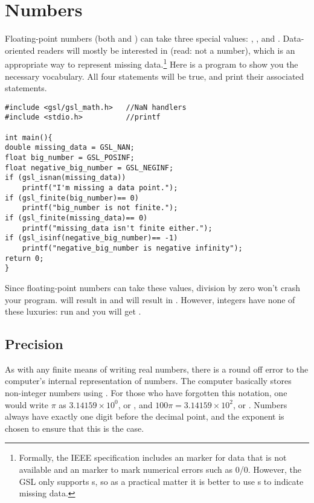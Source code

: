 \section{\treesymbol Numbers}       \label{numbers}
Floating-point numbers (both  and ) can take three special values: , , and . Data-oriented readers will mostly be
interested in  (read: not a number), which is an appropriate way to represent missing data.\footnote{Formally, the IEEE specification includes an  marker for data that is not available and an  marker to mark numerical errors such as 0/0. However, the GSL only supports s, so as a practical matter it is better to use s to indicate missing data.} Here is a
program to show you the necessary vocabulary. All four  statements will be true, and print their associated
statements.
\begin{lstlisting}
#include <gsl/gsl_math.h>   //NaN handlers
#include <stdio.h>          //printf

int main(){
double missing_data = GSL_NAN;
float big_number = GSL_POSINF;
float negative_big_number = GSL_NEGINF;
if (gsl_isnan(missing_data))
    printf("I'm missing a data point.");
if (gsl_finite(big_number)== 0)
    printf("big_number is not finite.");
if (gsl_finite(missing_data)== 0)
    printf("missing_data isn't finite either.");
if (gsl_isinf(negative_big_number)== -1)
    printf("negative_big_number is negative infinity");
return 0;
}
\end{lstlisting}

Since floating-point numbers can take these values, division by zero
won't crash your program.  will result in
 and  will result in . However, integers have none of these luxuries: run  and you will get .

\subsection{Precision} 
As with any finite means of writing real numbers,
there is a round off error to the computer's internal representation of
numbers. The computer basically stores non-integer numbers using
. For those who have forgotten this notation, one
would write  $\pi$ as $3.14159 \times 10^0$, or , 
and $100\pi = 3.14159 \times 10^2$, or . 
Numbers always have exactly one digit before the decimal point, and the
exponent is chosen to ensure that this is the case.

